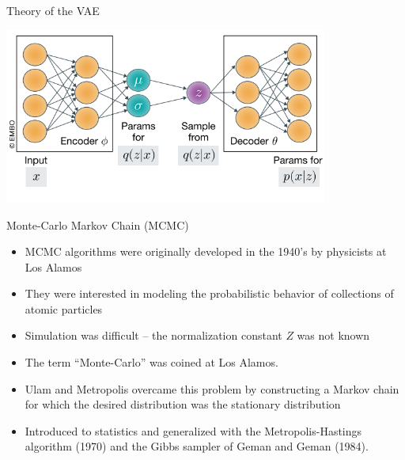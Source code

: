\documentclass{beamer}					%
\begin{document}
\begin{frame}{Theory of the VAE}

\begin{center}
\includegraphics[width=0.8\textwidth]{vae}
\end{center}

\end{frame}

\begin{frame}{Monte-Carlo Markov Chain (MCMC)}

\begin{itemize}

\item MCMC algorithms were originally developed in the 1940’s by physicists at
Los Alamos

\item They were interested in modeling the probabilistic behavior of collections of
atomic particles

\item Simulation was difficult – the normalization constant $Z$ was not known

\item The term “Monte-Carlo” was coined at Los Alamos.

\item Ulam and Metropolis overcame this problem by constructing a Markov chain
for which the desired distribution was the stationary distribution

\item Introduced to statistics and generalized with the Metropolis-Hastings
algorithm (1970) and the Gibbs sampler of Geman and Geman (1984).
\end{itemize}

\end{frame}
\end{document}
